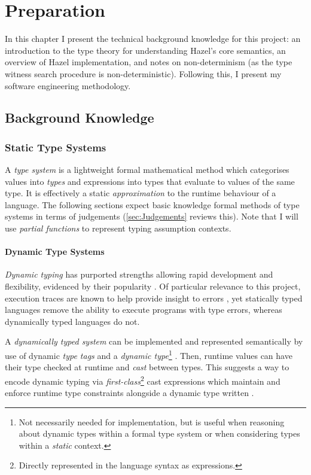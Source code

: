 \chapter{Preparation}
\label{chap:Preparation}
In this chapter I present the technical background knowledge for this project: an introduction to the type theory for understanding Hazel's core semantics, an overview of Hazel implementation, and notes on non-determinism (as the type witness search procedure is non-deterministic). Following this, I present my software engineering methodology.

\section{Background Knowledge}\label{sec:BackgroundKnowledge}
\subsection{Static Type Systems}\label{sec:TypeSystems}
A \textit{type system} is a lightweight formal mathematical method which categorises values into \textit{types} and expressions into types that evaluate to values of the same type. It is effectively a static \textit{approximation} to the runtime behaviour of a language. The following sections expect basic knowledge formal methods of type systems in terms of judgements (\cref{sec:Judgements} reviews this). Note that I will use \textit{partial functions} to represent typing assumption contexts. 


\subsubsection{Dynamic Type Systems}\label{sec:DynamicTypeSystem}
\textit{Dynamic typing} has purported strengths allowing rapid development and flexibility, evidenced by their popularity \cite{DynamicLangShift, TIOBE}. Of particular relevance to this project, execution traces are known to help provide insight to errors \cite{TraceVisualisation}, yet statically typed languages remove the ability to execute programs with type errors, whereas dynamically typed languages do not.\par 

A \textit{dynamically typed system} can be implemented and represented semantically by use of dynamic \textit{type tags} and a \textit{dynamic type}\footnote{Not necessarily needed for implementation, but is useful when reasoning about dynamic types within a formal type system or when considering types within a \textit{static} context.} \cite{DynamicTyping}. Then, runtime values can have their type checked at runtime and \textit{cast} between types. This suggests a way to encode dynamic typing via \textit{first-class}\footnote{Directly represented in the language syntax as expressions.} cast expressions which maintain and enforce runtime type constraints alongside a dynamic type written \dyn.


